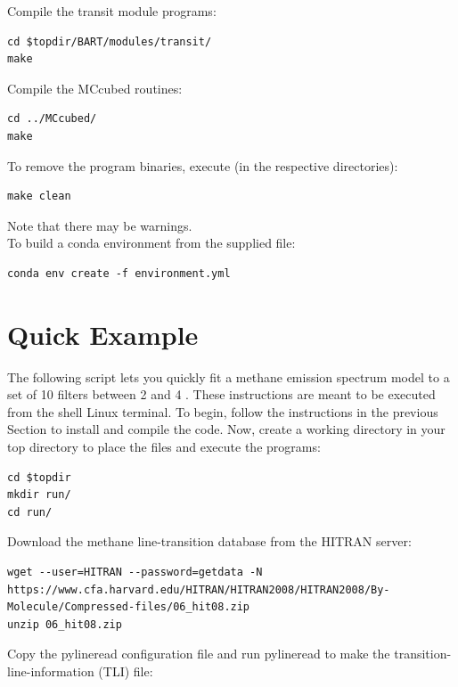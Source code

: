 \documentclass[letterpaper, 12pt]{article}
\begin{document}
\noindent Compile the transit module programs:
\begin{verbatim}
cd $topdir/BART/modules/transit/
make
\end{verbatim}

\noindent Compile the {\tttm MCcubed} routines:
\begin{verbatim}
cd ../MCcubed/
make
\end{verbatim}

\noindent To remove the program binaries, execute (in the respective
directories):
\begin{verbatim}
make clean
\end{verbatim}

\noindent Note that there may be warnings. \\

\noident To build a conda environment from the supplied file:
\begin{verbatim}
conda env create -f environment.yml
\end{verbatim}

\section{Quick Example}
\label{sec:quick-example}

The following script lets you quickly fit a methane emission spectrum
model to a set of 10 filters between 2 and 4 {\microns}.  These
instructions are meant to be executed from the shell Linux terminal.  To
begin, follow the instructions in the previous Section to install and
compile the code. Now, create a working directory in your top
directory to place the files and execute the programs:

{\fontsize{9.8}{1em}\selectfont 
\begin{verbatim}
cd $topdir
mkdir run/
cd run/
\end{verbatim}}

\noindent Download the methane line-transition database from the HITRAN server:

{\fontsize{9.8}{1em}\selectfont 
\begin{lstlisting}[breaklines]
wget --user=HITRAN --password=getdata -N https://www.cfa.harvard.edu/HITRAN/HITRAN2008/HITRAN2008/By-Molecule/Compressed-files/06_hit08.zip 
unzip 06_hit08.zip
\end{lstlisting}}


\noindent Copy the pylineread configuration file and run pylineread to
make the transition-line-information (TLI) file:
\end{document}
